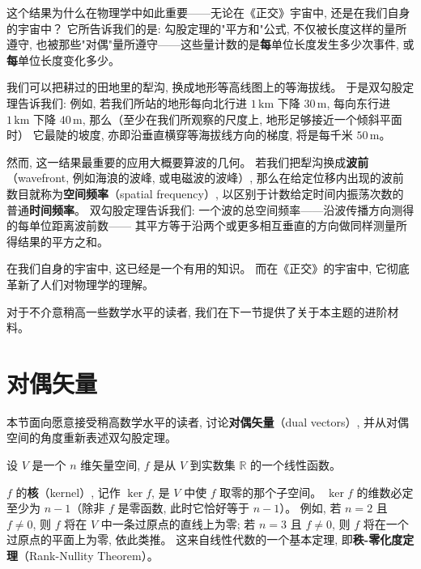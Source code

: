 
这个结果为什么在物理学中如此重要——无论在《正交》宇宙中, 还是在我们自身的宇宙中？
它所告诉我们的是: 勾股定理的"平方和"公式, 不仅被长度这样的量所遵守,
也被那些"对偶"量所遵守——这些量计数的是\textbf{每}单位长度发生多少次事件, 或\textbf{每}单位长度变化多少。

我们可以把耕过的田地里的犁沟, 换成地形等高线图上的等海拔线。
于是双勾股定理告诉我们: 例如, 若我们所站的地形每向北行进 $1\,\mathrm{km}$ 下降 $30\,\mathrm{m}$,
每向东行进 $1\,\mathrm{km}$ 下降 $40\,\mathrm{m}$,
那么（至少在我们所观察的尺度上, 地形足够接近一个倾斜平面时）
它最陡的坡度, 亦即沿垂直横穿等海拔线方向的梯度, 将是每千米 $50\,\mathrm{m}$。


然而, 这一结果最重要的应用大概要算波的几何。
若我们把犁沟换成\textbf{波前}（wavefront, 例如海浪的波峰, 或电磁波的波峰）,
那么在给定位移内出现的波前数目就称为\textbf{空间频率}（spatial frequency）,
以区别于计数给定时间内振荡次数的普通\textbf{时间频率}。
双勾股定理告诉我们: 一个波的总空间频率——沿波传播方向测得的每单位距离波前数——
其平方等于沿两个或更多相互垂直的方向做同样测量所得结果的平方之和。

在我们自身的宇宙中, 这已经是一个有用的知识。
而在《正交》的宇宙中, 它彻底革新了人们对物理学的理解。

对于不介意稍高一些数学水平的读者, 我们在下一节提供了关于本主题的进阶材料。

\section{对偶矢量}

\begin{notebox}[进阶内容]
本节面向愿意接受稍高数学水平的读者, 讨论\textbf{对偶矢量}（dual vectors）,
并从对偶空间的角度重新表述双勾股定理。
\end{notebox}

设 $V$ 是一个 $n$ 维矢量空间, $f$ 是从 $V$ 到实数集 $\mathbb{R}$ 的一个线性函数。

$f$ 的\textbf{核}（kernel）, 记作 $\ker f$, 是 $V$ 中使 $f$ 取零的那个子空间。
$\ker f$ 的维数必定至少为 $n-1$（除非 $f$ 是零函数, 此时它恰好等于 $n-1$）。
例如, 若 $n=2$ 且 $f \neq 0$, 则 $f$ 将在 $V$ 中一条过原点的直线上为零;
若 $n=3$ 且 $f \neq 0$, 则 $f$ 将在一个过原点的平面上为零, 依此类推。
这来自线性代数的一个基本定理, 即\textbf{秩-零化度定理}（Rank-Nullity Theorem）。


